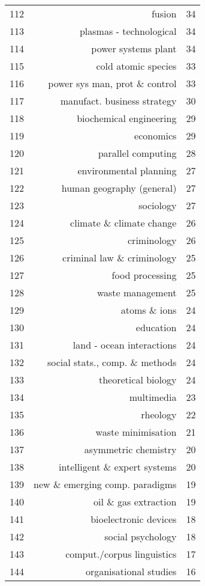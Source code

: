 \begin{spacing}{0.9}
\begin{longtable}[c]{r|r|>{\raggedleft\arraybackslash}m{2.3cm}}
{112} & {fusion} & {34}\\
{113} & {plasmas - technological} & {34}\\
{114} & {power systems plant} & {34}\\
{115} & {cold atomic species} & {33}\\
{116} & {power sys man, prot \& control} & {33}\\
{117} & {manufact. business strategy} & {30}\\
{118} & {biochemical engineering} & {29}\\
{119} & {economics} & {29}\\
{120} & {parallel computing} & {28}\\
{121} & {environmental planning} & {27}\\
{122} & {human geography (general)} & {27}\\
{123} & {sociology} & {27}\\
{124} & {climate \& climate change} & {26}\\
{125} & {criminology} & {26}\\
{126} & {criminal law \& criminology} & {25}\\
{127} & {food processing} & {25}\\
{128} & {waste management} & {25}\\
{129} & {atoms \& ions} & {24}\\
{130} & {education} & {24}\\
{131} & {land - ocean interactions} & {24}\\
{132} & {social stats., comp. \& methods} & {24}\\
{133} & {theoretical biology} & {24}\\
{134} & {multimedia} & {23}\\
{135} & {rheology} & {22}\\
{136} & {waste minimisation} & {21}\\
{137} & {asymmetric chemistry} & {20}\\
{138} & {intelligent \& expert systems} & {20}\\
{139} & {new \& emerging comp. paradigms} & {19}\\
{140} & {oil \& gas extraction} & {19}\\
{141} & {bioelectronic devices} & {18}\\
{142} & {social psychology} & {18}\\
{143} & {comput./corpus linguistics} & {17}\\
{144} & {organisational studies} & {16}\\

\end{longtable}
\end{spacing}
